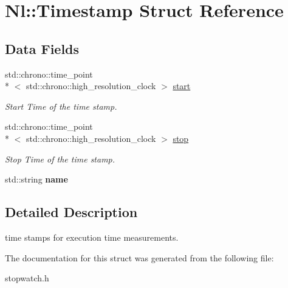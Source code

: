 \hypertarget{structNl_1_1Timestamp}{\section{Nl\-:\-:Timestamp Struct Reference}
\label{structNl_1_1Timestamp}
}
\subsection*{Data Fields}
\begin{DoxyCompactItemize}
\item 
\hypertarget{structNl_1_1Timestamp_a7d304f09a6d3be65abe2b9877fd4189d}{std\-::chrono\-::time\-\_\-point\\*
$<$ std\-::chrono\-::high\-\_\-resolution\-\_\-clock $>$ \hyperlink{structNl_1_1Timestamp_a7d304f09a6d3be65abe2b9877fd4189d}{start}}\label{structNl_1_1Timestamp_a7d304f09a6d3be65abe2b9877fd4189d}

\begin{DoxyCompactList}\small\item\em Start Time of the time stamp. \end{DoxyCompactList}\item 
\hypertarget{structNl_1_1Timestamp_ab45c53005c458d64af09798ffc569db8}{std\-::chrono\-::time\-\_\-point\\*
$<$ std\-::chrono\-::high\-\_\-resolution\-\_\-clock $>$ \hyperlink{structNl_1_1Timestamp_ab45c53005c458d64af09798ffc569db8}{stop}}\label{structNl_1_1Timestamp_ab45c53005c458d64af09798ffc569db8}

\begin{DoxyCompactList}\small\item\em Stop Time of the time stamp. \end{DoxyCompactList}\item 
\hypertarget{structNl_1_1Timestamp_ae7fdd155dcabcb5e00222fba0d5f1c62}{std\-::string {\bfseries name}}\label{structNl_1_1Timestamp_ae7fdd155dcabcb5e00222fba0d5f1c62}

\end{DoxyCompactItemize}


\subsection{Detailed Description}
time stamps for execution time measurements. 

The documentation for this struct was generated from the following file\-:\begin{DoxyCompactItemize}
\item 
stopwatch.\-h\end{DoxyCompactItemize}
